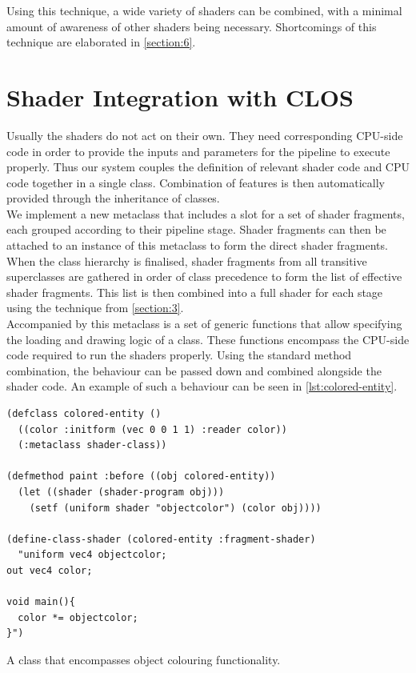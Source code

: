 \documentclass[format=sigconf]{acmart}
\begin{document}
Using this technique, a wide variety of shaders can be combined, with a minimal amount of awareness of other shaders being necessary. Shortcomings of this technique are elaborated in \autoref{section:6}.

\section{Shader Integration with CLOS}\label{section:4}
Usually the shaders do not act on their own. They need corresponding CPU-side code in order to provide the inputs and parameters for the pipeline to execute properly. Thus our system couples the definition of relevant shader code and CPU code together in a single class. Combination of features is then automatically provided through the inheritance of classes. \\

We implement a new metaclass that includes a slot for a set of shader fragments, each grouped according to their pipeline stage. Shader fragments can then be attached to an instance of this metaclass to form the direct shader fragments. When the class hierarchy is finalised, shader fragments from all transitive superclasses are gathered in order of class precedence to form the list of effective shader fragments. This list is then combined into a full shader for each stage using the technique from \autoref{section:3}. \\

Accompanied by this metaclass is a set of generic functions that allow specifying the loading and drawing logic of a class. These functions encompass the CPU-side code required to run the shaders properly. Using the standard method combination, the behaviour can be passed down and combined alongside the shader code. An example of such a behaviour can be seen in \autoref{lst:colored-entity}.\\

\begin{listing}[h]
\begin{verbatim}
(defclass colored-entity ()
  ((color :initform (vec 0 0 1 1) :reader color))
  (:metaclass shader-class))

(defmethod paint :before ((obj colored-entity))
  (let ((shader (shader-program obj)))
    (setf (uniform shader "objectcolor") (color obj))))

(define-class-shader (colored-entity :fragment-shader)
  "uniform vec4 objectcolor;
out vec4 color;

void main(){
  color *= objectcolor;
}")
\end{verbatim}
\caption{A  class that encompasses object colouring functionality.}
\label{lst:colored-entity}
\end{listing}
\end{document}
